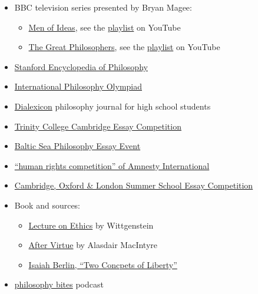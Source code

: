 \documentclass{article}
\begin{document}
\begin{itemize}
    \item BBC television series presented by Bryan Magee:
    \begin{itemize}
        \item \href{https://en.wikipedia.org/wiki/Men_of_Ideas}{Men of Ideas}, see the \href{https://www.youtube.com/playlist?list=PLf0rWsvaclOLt4XUh6b3lKkmJ7lAOzMHa}{playlist} on YouTube
        \item \href{https://en.wikipedia.org/wiki/The_Great_Philosophers}{The Great Philosophers}, see the \href{https://www.youtube.com/playlist?list=PLhP9EhPApKE8B-g03RivIMt7llh1cyEGV}{playlist} on YouTube
    \end{itemize}
    \item \href{https://plato.stanford.edu/}{Stanford Encyclopedia of Philosophy}
    \item \href{https://www.philosophy-olympiad.org/}{International Philosophy Olympiad}
    \item \href{https://www.dialexicon.org/}{Dialexicon} philosophy journal for high school students
    \item \href{https://www.trin.cam.ac.uk/undergraduate/essay-prizes/}{Trinity College Cambridge Essay Competition}
    \item \href{https://bspee.wordpress.com/}{Baltic Sea Philosophy Essay Event}
    \item \href{https://www.amnesty.org.uk/use-your-voice}{``human rights competition'' of Amnesty International}
    \item \href{https://www.immerse.education/essay-competition/}{Cambridge, Oxford \& London Summer School Essay Competition}
    \item Book and sources:
    \begin{itemize}
        \item \href{https://www.goodreads.com/da/book/show/17563346-lecture-on-ethics}{Lecture on Ethics} by Wittgenstein
        \item \href{https://www.goodreads.com/book/show/332138.After_Virtue}{After Virtue} by  Alasdair MacIntyre
        \item \href{https://web.archive.org/web/20211201034753/https://cactus.dixie.edu/green/B_Readings/I_Berlin%20Two%20Concpets%20of%20Liberty.pdf}{Isaiah Berlin, ``Two Concpets of Liberty''}
    \end{itemize}
    \item \href{https://nigelwarburton.typepad.com/philosophy_bites/}{philosophy bites} podcast
\end{itemize}
\end{document}
